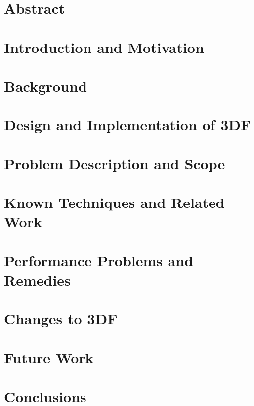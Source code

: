 \documentclass{article}
\begin{document}
\tableofcontents

\newpage

\section{Abstract} \label{abstract}

\section{Introduction and Motivation} \label{intro}


\section{Background} \label{background}


\section{Design and Implementation of 3DF} \label{3df}


\section{Problem Description and Scope} \label{problem}


\section{Known Techniques and Related Work} \label{known-techniques}


\section{Performance Problems and Remedies} \label{catalog}


\section{Changes to 3DF} \label{implementation}


\section{Future Work} \label{future-work}


\section{Conclusions} \label{conclusions}

\newpage



\end{document}
